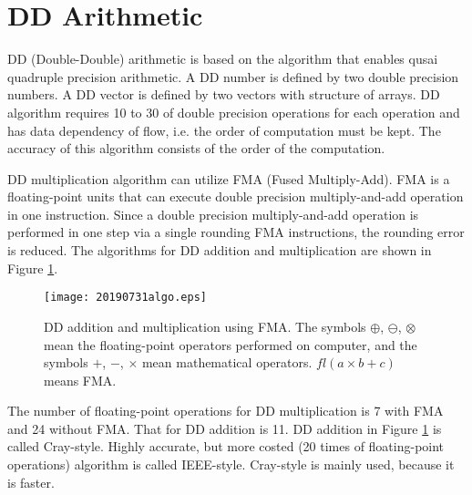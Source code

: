 \documentclass{IOS-Book-Article}
\begin{document}
\section{DD Arithmetic}

DD (Double-Double) arithmetic\cite{DD} is based on the algorithm that enables qusai quadruple precision arithmetic.
A DD number is defined by two double precision numbers. A DD vector is defined by two vectors with structure of arrays.
DD algorithm requires 10 to 30 of double precision operations for each operation and has data dependency of flow, i.e. the order of computation must be kept. The accuracy of this algorithm consists of the order of the computation. 

DD multiplication algorithm\cite{QD} can utilize FMA (Fused Multiply-Add). 
FMA is a floating-point units that can execute double precision multiply-and-add operation in one instruction. Since a double precision multiply-and-add operation is performed in one step via a single rounding FMA instructions, the rounding error is reduced. 
The algorithms for DD addition and multiplication are shown in Figure \ref{fig1}.

\begin{figure}[htbp]
  \begin{center}
    \texttt{[image: 20190731algo.eps]}
    \caption{DD addition and multiplication using FMA. The symbols $\oplus$, $\ominus$, $\otimes$ mean the floating-point operators performed on computer, and the symbols $+$, $-$, $\times$ mean mathematical operators. 
$fl(a\times b+c)$ means FMA.}
\label{fig1}
  \end{center}
\end{figure}

The number of floating-point operations for DD multiplication is 7 with FMA and 24 without FMA.
That for DD addition is 11. DD addition in Figure \ref{fig1} is called Cray-style\cite{ichi}. Highly accurate, but more costed (20 times of floating-point operations) algorithm is called IEEE-style\cite{ichi}. Cray-style is mainly used, because it is faster\cite{DDBLAS}. 
\end{document}
